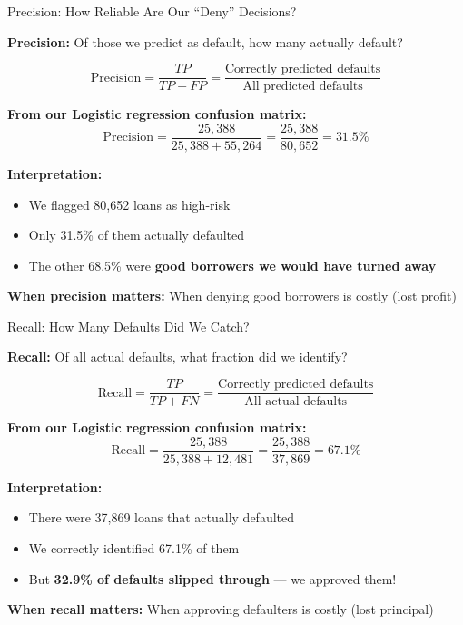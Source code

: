 \documentclass[10pt]{beamer}
\newcommand{\highlight}[1]{\textcolor{AccentOrange}{\textbf{#1}}}
\begin{document}
\begin{frame}{Precision: How Reliable Are Our ``Deny'' Decisions?}

  \textbf{Precision:} Of those we predict as default, how many actually default?

  \[
  \text{Precision} = \frac{TP}{TP + FP} = \frac{\text{Correctly predicted defaults}}{\text{All predicted defaults}}
  \]

  \vspace{0.5em}
  \textbf{From our Logistic regression confusion matrix:}
  \[
  \text{Precision} = \frac{25,388}{25,388 + 55,264} = \frac{25,388}{80,652} = 31.5\%
  \]

  \vspace{1em}
  \textbf{Interpretation:}
  \begin{itemize}
    \item We flagged 80,652 loans as high-risk
    \item Only 31.5\% of them actually defaulted
    \item The other 68.5\% were \highlight{good borrowers we would have turned away}
  \end{itemize}

  \vspace{0.5em}
  \textbf{When precision matters:} When denying good borrowers is costly (lost profit)
\end{frame}


\begin{frame}{Recall: How Many Defaults Did We Catch?}

  \textbf{Recall:} Of all actual defaults, what fraction did we identify?

  \[
  \text{Recall} = \frac{TP}{TP + FN} = \frac{\text{Correctly predicted defaults}}{\text{All actual defaults}}
  \]

  \vspace{0.5em}
  \textbf{From our Logistic regression confusion matrix:}
  \[
  \text{Recall} = \frac{25,388}{25,388 + 12,481} = \frac{25,388}{37,869} = 67.1\%
  \]

  \vspace{1em}
  \textbf{Interpretation:}
  \begin{itemize}
    \item There were 37,869 loans that actually defaulted
    \item We correctly identified 67.1\% of them
    \item But \highlight{32.9\% of defaults slipped through} --- we approved them!
  \end{itemize}

  \vspace{0.5em}
  \textbf{When recall matters:} When approving defaulters is costly (lost principal)
\end{frame}
\end{document}
